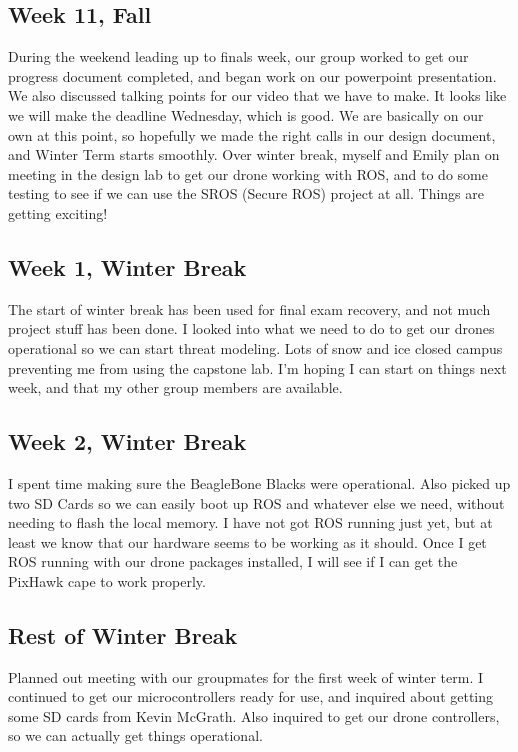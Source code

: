 \documentclass[IEEEtran,letterpaper,10pt,notitlepage,draftclsnofoot,onecolumn]{article}
\begin{document}
                            \subsection{Week 11, Fall}
                            During the weekend leading up to finals week, our group worked to get our progress document completed, and began work on our powerpoint presentation. We also discussed talking points for our video that we have to make. It looks like we will make the deadline Wednesday, which is good. We are basically on our own at this point, so hopefully we made the right calls in our design document, and Winter Term starts smoothly. Over winter break, myself and Emily plan on meeting in the design lab to get our drone working with ROS, and to do some testing to see if we can use the SROS (Secure ROS) project at all. Things are getting exciting!
                            \subsection{Week 1, Winter Break}
                            The start of winter break has been used for final exam recovery, and not much project stuff has been done. I looked into what we need to do to get our drones operational so we can start threat modeling. Lots of snow and ice closed campus preventing me from using the capstone lab. I'm hoping I can start on things next week, and that my other group members are available.
                            \subsection{Week 2, Winter Break}
                            I spent time making sure the BeagleBone Blacks were operational. Also picked up two SD Cards so we can easily boot up ROS and whatever else we need, without needing to flash the local memory. I have not got ROS running just yet, but at least we know that our hardware seems to be working as it should. Once I get ROS running with our drone packages installed, I will see if I can get the PixHawk cape to work properly.
                            \subsection{Rest of Winter Break}
                            Planned out meeting with our groupmates for the first week of winter term. I continued to get our microcontrollers ready for use, and inquired about getting some SD cards from Kevin McGrath. Also inquired to get our drone controllers, so we can actually get things operational.
\end{document}
